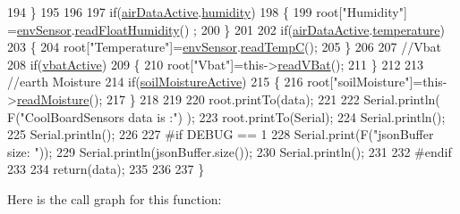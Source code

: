 \begin{DoxyCode}
194     \}
195     
196         
197     \textcolor{keywordflow}{if}(\hyperlink{class_cool_board_sensors_abff8dfeccb2f7689847bb64d5f1cd31e}{airDataActive}.\hyperlink{struct_cool_board_sensors_1_1air_active_ab69738e9fd1c2ba80dc666bcd1e116f7}{humidity}) 
198     \{   
199         root[\textcolor{stringliteral}{"Humidity"}] =\hyperlink{class_cool_board_sensors_a868e38985e9a2412829fa2790ca13e2e}{envSensor}.\hyperlink{class_b_m_e280_a42ea7232039eebf5aadb391ef6132c35}{readFloatHumidity}() ;
200     \}   
201     
202     \textcolor{keywordflow}{if}(\hyperlink{class_cool_board_sensors_abff8dfeccb2f7689847bb64d5f1cd31e}{airDataActive}.\hyperlink{struct_cool_board_sensors_1_1air_active_ac08576736c7ac3bfbfec32e5ee17c686}{temperature})
203     \{
204         root[\textcolor{stringliteral}{"Temperature"}]=\hyperlink{class_cool_board_sensors_a868e38985e9a2412829fa2790ca13e2e}{envSensor}.\hyperlink{class_b_m_e280_afffdd1d7ded9e1f92200e70669019d97}{readTempC}();
205     \}
206     
207     \textcolor{comment}{//Vbat}
208     \textcolor{keywordflow}{if}(\hyperlink{class_cool_board_sensors_ab0b4bbae83796b52b90f91008d383583}{vbatActive})    
209     \{   
210         root[\textcolor{stringliteral}{"Vbat"}]=this->\hyperlink{class_cool_board_sensors_a6944b6ea7bce8e2fce1b434acfd9d5f3}{readVBat}();
211     \}
212     
213     \textcolor{comment}{//earth Moisture}
214     \textcolor{keywordflow}{if}(\hyperlink{class_cool_board_sensors_ae7971bf527781ac4994309591b78ab89}{soilMoistureActive})
215     \{   
216         root[\textcolor{stringliteral}{"soilMoisture"}]=this->\hyperlink{class_cool_board_sensors_a8761bff50373c485f4465c8db47d0633}{readMoisture}();
217     \}
218     
219     
220     root.printTo(data);
221 
222     Serial.println( F(\textcolor{stringliteral}{"CoolBoardSensors data is :"}) );
223     root.printTo(Serial);
224     Serial.println();
225     Serial.println();
226 
227 \textcolor{preprocessor}{#if DEBUG == 1}
228     Serial.print(F(\textcolor{stringliteral}{"jsonBuffer size: "}));
229     Serial.println(jsonBuffer.size());
230     Serial.println();
231 
232 \textcolor{preprocessor}{#endif}
233 
234     \textcolor{keywordflow}{return}(data);   
235     
236 
237 \}
\end{DoxyCode}
Here is the call graph for this function\+:\nopagebreak
